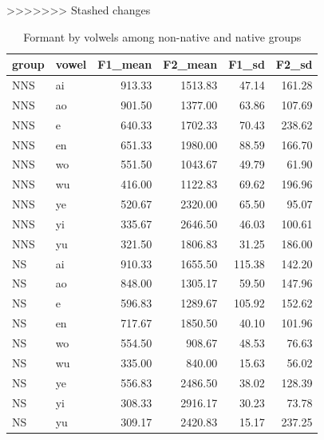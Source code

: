 \documentclass[man, fleqn, noextraspace]{apa6}
\begin{document}
>>>>>>> Stashed changes
\begin{table}

\caption{\label{tab:table1}Formant by volwels among non-native and native groups}
\centering
\begin{tabular}[t]{llrrrr}
\toprule
group & vowel & F1\_mean & F2\_mean & F1\_sd & F2\_sd\\
\midrule
NNS & ai & 913.33 & 1513.83 & 47.14 & 161.28\\
NNS & ao & 901.50 & 1377.00 & 63.86 & 107.69\\
NNS & e & 640.33 & 1702.33 & 70.43 & 238.62\\
NNS & en & 651.33 & 1980.00 & 88.59 & 166.70\\
NNS & wo & 551.50 & 1043.67 & 49.79 & 61.90\\
\addlinespace
NNS & wu & 416.00 & 1122.83 & 69.62 & 196.96\\
NNS & ye & 520.67 & 2320.00 & 65.50 & 95.07\\
NNS & yi & 335.67 & 2646.50 & 46.03 & 100.61\\
NNS & yu & 321.50 & 1806.83 & 31.25 & 186.00\\
NS & ai & 910.33 & 1655.50 & 115.38 & 142.20\\
\addlinespace
NS & ao & 848.00 & 1305.17 & 59.50 & 147.96\\
NS & e & 596.83 & 1289.67 & 105.92 & 152.62\\
NS & en & 717.67 & 1850.50 & 40.10 & 101.96\\
NS & wo & 554.50 & 908.67 & 48.53 & 76.63\\
NS & wu & 335.00 & 840.00 & 15.63 & 56.02\\
\addlinespace
NS & ye & 556.83 & 2486.50 & 38.02 & 128.39\\
NS & yi & 308.33 & 2916.17 & 30.23 & 73.78\\
NS & yu & 309.17 & 2420.83 & 15.17 & 237.25\\
\bottomrule
\end{tabular}
\end{table}
\end{document}
